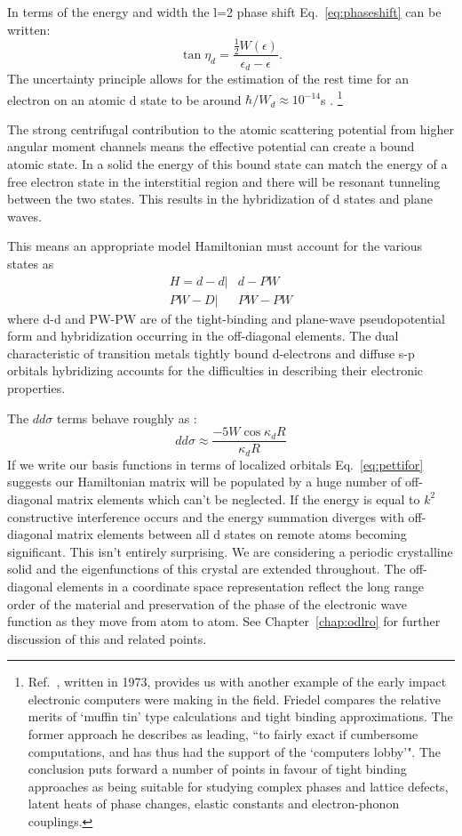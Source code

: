 In terms of the energy and width the l=2 phase shift Eq.~\ref{eq:phaseshift} 
can be written:
%
\begin{equation}
\label{eq:dshift}
\tan \eta_{d} = \frac{\frac{1}{2}W(\epsilon)}{\epsilon_{d}-\epsilon}.
\end{equation}
%
The uncertainty principle allows for the estimation of the rest
time for an electron on an atomic d state to be around $\hbar/W_{d}\approx 10^{-14}$s \cite{friedel73}.
\footnote{Ref.~\cite{friedel73}, written in 1973, provides us with another example
of the early impact electronic computers were making in the field. Friedel  compares 
the relative merits of `muffin tin' type calculations and tight binding approximations.
The former approach he describes as leading, ``to fairly exact if cumbersome
computations, and has thus had the support of the `computers lobby'". The conclusion
puts forward a number of points in favour of tight binding approaches as 
being suitable for studying complex phases and lattice defects,
latent heats of phase changes, elastic constants and electron-phonon couplings.}

The strong centrifugal contribution to the
atomic scattering potential from higher angular moment channels means the effective potential
can create a bound atomic state. In a solid the energy of this bound state can match the 
energy of a free electron state in the interstitial region and there will
be resonant tunneling between the two states. This results in the hybridization of d states
and plane waves. 

This means an appropriate model Hamiltonian must account for the various states as
%
\begin{align}
\label{eq:d-hamiltonian}
H =  d-d  |&  d-PW \\
     PW-D |& PW-PW 
\end{align}
%
where d-d and PW-PW are of the tight-binding and plane-wave 
pseudopotential form and hybridization occurring in the 
off-diagonal elements. The dual characteristic of transition metals
tightly bound d-electrons and diffuse s-p orbitals hybridizing 
accounts for the difficulties in describing their electronic properties.


The $dd\sigma$ terms behave roughly as \cite{pettifor71}:
%
\begin{equation}
\label{eq:pettifor}
dd\sigma \approx \frac{-5W\cos\kappa_{d}R}{\kappa_{d}R}
\end{equation}
%
If we write our basis functions in terms of localized orbitals
Eq.~\ref{eq:pettifor} suggests our Hamiltonian matrix will be 
populated by a huge number of off-diagonal matrix elements which can't be neglected. If 
the energy is equal to $k^{2}$ constructive interference occurs and the energy summation
diverges with off-diagonal matrix elements between all d states on remote atoms becoming
significant. This isn't entirely surprising. We are considering a periodic crystalline solid
and the eigenfunctions of this crystal are extended throughout. The off-diagonal elements
in a coordinate space representation reflect the long range order of the material and
preservation of the phase of the electronic wave function as they move from atom to atom. See
Chapter~\ref{chap:odlro} for further discussion of this and related points.

